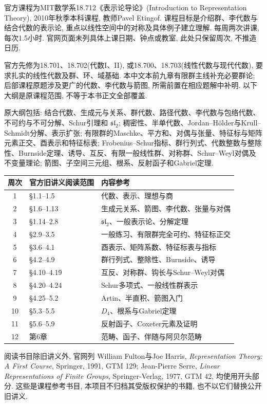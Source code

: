 \clearpage
{}
\par
官方课程为MIT数学系18.712《表示论导论》(Introduction to Representation Theory), 2010年秋季本科课程, 教师Pavel Etingof. 课程目标是介绍群、李代数与结合代数的表示论, 重点以线性空间中的对称及具体例子建立理解. 每周两次讲课, 每次1.5小时. 官网页面未列具体上课日期、钟点或教室, 此处只保留周次, 不推造日历.

官方先修为18.701、18.702(代数I、II), 或18.700、18.703(线性代数与现代代数), 要求扎实的线性代数及群、环、域基础. 本中文本前九章有限群主线补充必要群论; 后部课程原题涉及更广的代数、李代数与箭图, 所需前置在相应题解中补明. 以下大纲是原课程范围, 不等于本书正文全部覆盖.

原大纲包括: 结合代数、生成元与关系、群代数、路径代数、李代数与包络代数、不可约与不可分解、Schur引理和 $\mathfrak{sl}_2$; 稠密性、半单代数、Jordan--Hölder与Krull--Schmidt分解、表示扩张; 有限群的Maschke、平方和、对偶与张量、特征标与矩阵元素正交、酉表示和特征标表; Frobenius--Schur指标、群行列式、代数整数与整除性、Burnside定理、诱导、互反、有限一般线性群、对称群、Schur--Weyl对偶及不变量理论; 箭图、子空间三元组、根系、反射函子和Gabriel定理.

\begin{longtable}{c p{} p{}}
\toprule 周次&官方旧讲义阅读范围&内容参考\\\midrule\endhead
1&§1.1--1.5&代数、表示、理想与商\\
2&§1.6--1.13&生成元关系、箭图、李代数、张量与对偶\\
3&§1.14--2.8&$\mathfrak{sl}_2$、一般表示论、分解定理\\
4&§2.9--3.5&一般练习、有限群完全可约、特征标正交\\
5&§3.6--4.1&酉表示、矩阵系数、特征标表与指标\\
6&§4.2--4.9&群行列式、整除性、Burnside、诱导\\
7&§4.10--4.19&互反、对称群、钩长与Schur--Weyl对偶\\
8&§4.20--4.24&Schur多项式、一般线性群表示\\
9&§4.25--5.2&Artin、半直积、箭图入门\\
10&§5.3--5.5&$D_4$、根系与Gabriel定理\\
11&§5.6--5.9&反射函子、Coxeter元素及证明\\
12&第6章&范畴、函子、伴随与阿贝尔范畴\\\bottomrule
\end{longtable}
阅读书目除旧讲义外, 官网列 William Fulton与Joe Harris, \textit{Representation Theory: A First Course}, Springer, 1991, GTM 129; Jean-Pierre Serre, \textit{Linear Representations of Finite Groups}, Springer-Verlag, 1977, GTM 42, 均使用开头部分. 这些是课程参考书目, 本项目不归档其受版权保护的书籍, 也不以它们替换公开旧讲义.

